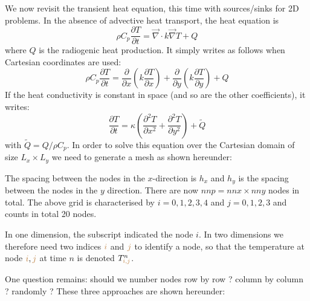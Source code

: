 We now revisit the transient heat equation, this time with sources/sinks for 2D problems.
In the absence of advective heat transport, the heat equation is 
\begin{equation}
\rho C_p \frac{\partial T}{\partial t} =
\vec\nabla \cdot k \vec\nabla T + Q 
\end{equation}
where $Q$ is the radiogenic heat production.
It simply writes as follows when Cartesian coordinates are used:
\begin{equation}
\rho C_p \frac{\partial T}{\partial t} = 
\frac{\partial }{\partial x} \left(  k  \frac{\partial T}{\partial x} \right)+
\frac{\partial }{\partial y} \left(  k  \frac{\partial T}{\partial y} \right)+ Q
\end{equation}
If the heat conductivity is constant in space (and so are the other coefficients), 
it writes:
\begin{equation}
\frac{\partial T}{\partial t} =
\kappa \left(  \frac{\partial^2 T}{\partial x^2} + \frac{\partial^2 T}{\partial y^2} \right)+
\tilde{Q}
\end{equation}
with $\tilde{Q}=Q/\rho C_p$.
In order to solve this equation over the Cartesian domain of size $L_x \times L_y$
we need to generate a mesh as shown hereunder:

\begin{minipage}[t]{\textwidth}
\begin{center}

\end{center}
\end{minipage}

The spacing between the nodes in the $x$-direction is $h_x$ and $h_y$ is the spacing
between the nodes in the $y$ direction. There are now $nnp=nnx\times nny$ nodes in total.
The above grid is characterised by $i=0,1,2,3,4$ and $j=0,1,2,3$ and counts in total 
20 nodes.

In one dimension, the subscript indicated the node $i$. In two dimensions we therefore 
need two indices ${\color{brown}i}$ and ${\color{brown}j}$ 
to identify a node, so that the temperature at node ${\color{brown}i},{\color{brown}j}$ 
at time $n$ is denoted $T_{{\color{brown}i,j}}^n$.

One question remains: should we number nodes 
row by row ? column by column ? randomly ? 
These three approaches are shown hereunder: 

